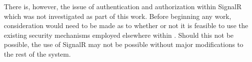 There is, however, the issue of authentication and authorization within SignalR which was not investigated as part of this work.  Before beginning any work, consideration would need to be made as to whether or not it is feasible to use the existing security mechanisms employed elsewhere within .  Should this not be possible, the use of SignalR may not be possible without major modifications to the rest of the system.
